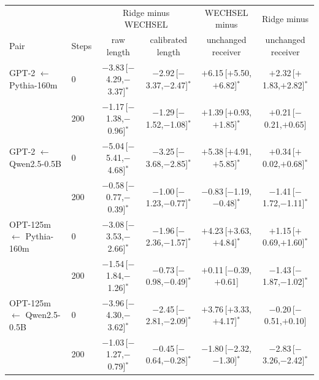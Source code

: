 \begin{tabular}{llcccc}
\toprule
 & & \multicolumn{2}{c}{Ridge minus WECHSEL} & WECHSEL minus & Ridge minus\\
Pair & Steps & raw length & calibrated length & unchanged receiver & unchanged receiver\\
\midrule
GPT-2 $\leftarrow$ Pythia-160m & 0 & $-$3.83\,[$-$4.29,$-$3.37]$^{*}$ & $-$2.92\,[$-$3.37,$-$2.47]$^{*}$ & $+$6.15\,[$+$5.50,$+$6.82]$^{*}$ & $+$2.32\,[$+$1.83,$+$2.82]$^{*}$\\
 & 200 & $-$1.17\,[$-$1.38,$-$0.96]$^{*}$ & $-$1.29\,[$-$1.52,$-$1.08]$^{*}$ & $+$1.39\,[$+$0.93,$+$1.85]$^{*}$ & $+$0.21\,[$-$0.21,$+$0.65]\\
\addlinespace
GPT-2 $\leftarrow$ Qwen2.5-0.5B & 0 & $-$5.04\,[$-$5.41,$-$4.68]$^{*}$ & $-$3.25\,[$-$3.68,$-$2.85]$^{*}$ & $+$5.38\,[$+$4.91,$+$5.85]$^{*}$ & $+$0.34\,[$+$0.02,$+$0.68]$^{*}$\\
 & 200 & $-$0.58\,[$-$0.77,$-$0.39]$^{*}$ & $-$1.00\,[$-$1.23,$-$0.77]$^{*}$ & $-$0.83\,[$-$1.19,$-$0.48]$^{*}$ & $-$1.41\,[$-$1.72,$-$1.11]$^{*}$\\
\addlinespace
OPT-125m $\leftarrow$ Pythia-160m & 0 & $-$3.08\,[$-$3.53,$-$2.66]$^{*}$ & $-$1.96\,[$-$2.36,$-$1.57]$^{*}$ & $+$4.23\,[$+$3.63,$+$4.84]$^{*}$ & $+$1.15\,[$+$0.69,$+$1.60]$^{*}$\\
 & 200 & $-$1.54\,[$-$1.84,$-$1.26]$^{*}$ & $-$0.73\,[$-$0.98,$-$0.49]$^{*}$ & $+$0.11\,[$-$0.39,$+$0.61] & $-$1.43\,[$-$1.87,$-$1.02]$^{*}$\\
\addlinespace
OPT-125m $\leftarrow$ Qwen2.5-0.5B & 0 & $-$3.96\,[$-$4.30,$-$3.62]$^{*}$ & $-$2.45\,[$-$2.81,$-$2.09]$^{*}$ & $+$3.76\,[$+$3.33,$+$4.17]$^{*}$ & $-$0.20\,[$-$0.51,$+$0.10]\\
 & 200 & $-$1.03\,[$-$1.27,$-$0.79]$^{*}$ & $-$0.45\,[$-$0.64,$-$0.28]$^{*}$ & $-$1.80\,[$-$2.32,$-$1.30]$^{*}$ & $-$2.83\,[$-$3.26,$-$2.42]$^{*}$\\
\bottomrule
\end{tabular}

